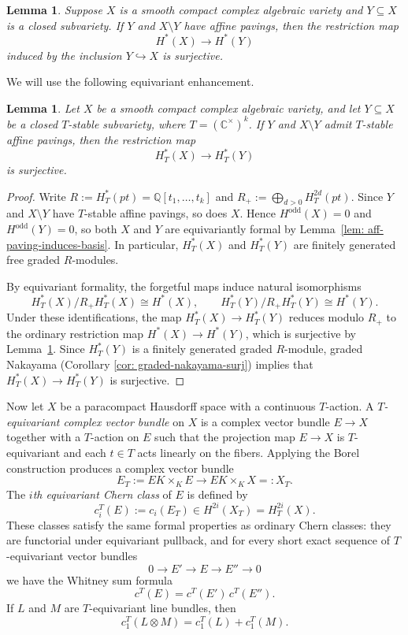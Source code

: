 \documentclass[11pt]{amsart}
\numberwithin{equation}{section}
\newtheorem{lemma}[theorem]{Lemma}
\theoremstyle{definition}
\newcommand{\CC}{{\mathbb{C}}}
\newcommand{\QQ}{{\mathbb{Q}}}
\begin{document}
\begin{lemma}\label{lem: rel-paving-surj}\cite{GLW}
    Suppose $X$ is a smooth compact complex algebraic variety and
    $Y\subseteq X$ is a closed subvariety. If $Y$ and $X\setminus Y$ have affine
    pavings, then the restriction map
    \[
        H^*(X)\to H^*(Y)
    \]
    induced by the inclusion $Y\hookrightarrow X$ is surjective.
\end{lemma}

We will use the following equivariant enhancement.

\begin{lemma}\label{lem: rel-paving-equiv-surj}
    Let $X$ be a smooth compact complex algebraic variety, and let
    $Y\subseteq X$ be a closed $T$-stable subvariety, where
    $T=(\CC^\times)^k$. If $Y$ and $X\setminus Y$ admit $T$-stable affine
    pavings, then the restriction map
    \[
        H_T^*(X)\to H_T^*(Y)
    \]
    is surjective.
\end{lemma}

\begin{proof}
    Write $R:=H_T^*(pt)=\QQ[t_1,\dots,t_k]$ and
    $R_+:=\bigoplus_{d>0} H_T^{2d}(pt)$. Since $Y$ and $X\setminus Y$ have
    $T$-stable affine pavings, so does $X$. Hence $H^{\mathrm{odd}}(X)=0$ and
    $H^{\mathrm{odd}}(Y)=0$, so both $X$ and $Y$ are equivariantly formal by
    Lemma~\ref{lem: aff-paving-induces-basis}. In particular, $H_T^*(X)$ and
    $H_T^*(Y)$ are finitely generated free graded $R$-modules.

    By equivariant formality, the forgetful maps induce natural isomorphisms
    \[
        H_T^*(X)/R_+H_T^*(X)\cong H^*(X),
        \qquad
        H_T^*(Y)/R_+H_T^*(Y)\cong H^*(Y).
    \]
    Under these identifications, the map $H_T^*(X)\to H_T^*(Y)$ reduces modulo
    $R_+$ to the ordinary restriction map $H^*(X)\to H^*(Y)$, which is
    surjective by Lemma~\ref{lem: rel-paving-surj}. Since $H_T^*(Y)$ is a
    finitely generated graded $R$-module, graded Nakayama (Corollary \ref{cor: graded-nakayama-surj}) implies that
    $H_T^*(X)\to H_T^*(Y)$ is surjective.
\end{proof}

Now let $X$ be a paracompact Hausdorff space with a continuous $T$-action. A
\emph{$T$-equivariant complex vector bundle} on $X$ is a complex vector bundle
$E\to X$ together with a $T$-action on $E$ such that the projection map
$E\to X$ is $T$-equivariant and each $t\in T$ acts linearly on the fibers.
Applying the Borel construction produces a complex vector bundle
\[
E_T:=EK\times_K E \longrightarrow EK\times_K X=:X_T.
\]
The \emph{$i$th equivariant Chern class} of $E$ is defined by
\[
    c_i^T(E):=c_i(E_T)\in H^{2i}(X_T)=H_T^{2i}(X).
\]
These classes satisfy the same formal properties as ordinary Chern classes:
they are functorial under equivariant pullback, and for every short exact
sequence of $T$-equivariant vector bundles
\[
0\to E'\to E\to E''\to 0
\]
we have the Whitney sum formula
\[
    c^T(E)=c^T(E')\,c^T(E'').
\]
If $L$ and $M$ are $T$-equivariant line bundles, then
\[
    c_1^T(L\otimes M)=c_1^T(L)+c_1^T(M).
\]
\end{document}
